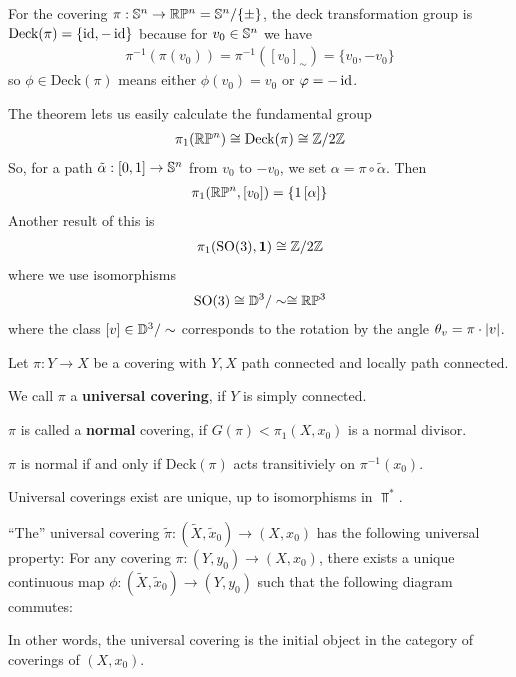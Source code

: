 \begin{ex}[]
For the covering $\pi: \mathbb{S}^{n} \to  \mathbb{R}\mathbb{P}^{n} = \mathbb{S}^{n}/\{\pm\}$, the deck transformation group is
$\text{Deck}(\pi) = \{\operatorname{id}, - \operatorname{id}\}$
because for $v_0 \in \mathbb{S}^{n}$ we have
\begin{align*}
  \pi^{-1}(\pi(v_0)) = \pi^{-1}([v_0]_{\sim}) = \{v_0,-v_0\}
\end{align*}
so $\phi \in \text{Deck}(\pi)$ means either $\phi(v_0) = v_0$ or $\varphi = - \operatorname{id}$.

The theorem lets us easily calculate the fundamental group
\begin{align*}
  \pi_1(\mathbb{R}\mathbb{P}^{n}) \cong \text{Deck}(\pi) \cong \mathbb{Z}/2\mathbb{Z}
\end{align*}
So, for a path $\tilde{\alpha}:[0,1] \to \mathbb{S}^{n}$ from $v_0$ to $-v_0$, we set $\alpha = \pi \circ \tilde{\alpha}$.
Then
\begin{align*}
  \pi_1(\mathbb{R}\mathbb{P}^{n},[v_0]) = \{1\, [\alpha]\}
\end{align*}
Another result of this is
\begin{align*}
  \pi_1(\text{SO}(3),\bm{1}) \cong \mathbb{Z}/2\mathbb{Z}
\end{align*}
where we use isomorphisms
\begin{align*}
  \text{SO}(3) \cong \mathbb{D}^{3}/\sim \cong \mathbb{R}\mathbb{P}^{3}
\end{align*}
where the class $[v] \in \mathbb{D}^{3}/\sim$ corresponds to the rotation by the angle $\theta_v = \pi \cdot \vert v\vert$.
\end{ex}


\begin{dfn}[]
Let $\pi: Y \to  X$ be a covering with $Y,X$ path connected and locally path connected.

We call $\pi$ a \textbf{universal covering}, if $Y$ is simply connected.

$\pi$ is called a \textbf{normal} covering, if $G(\pi) < \pi_1(X,x_0)$ is a normal divisor.
\end{dfn}

\begin{rem}[]
  $\pi$ is normal if and only if $\text{Deck}(\pi)$ acts transitiviely on $\pi^{-1}(x_0)$.

  Universal coverings exist are unique, up to isomorphisms in $\Top^{\ast}$.

  ``The'' universal covering $\tilde{\pi}: (\tilde{X},\tilde{x}_0) \to (X,x_0)$ has the following universal property:
  For any covering $\pi:(Y,y_0) \to  (X,x_0)$, there exists a unique continuous map
  $\phi: (\tilde{X},\tilde{x}_0) \to  (Y,y_0)$ such that the following diagram commutes:

  \begin{center}
  \end{center}
  In other words, the universal covering is the initial object in the category of coverings of $(X,x_0)$.
\end{rem}



